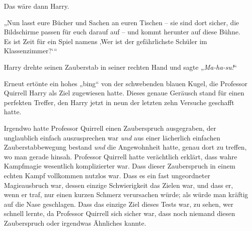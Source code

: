 Das wäre dann Harry.

„Nun lasst eure Bücher und Sachen an euren Tischen – sie sind dort sicher, die Bildschirme passen für euch darauf auf – und kommt herunter auf diese Bühne. Es ist Zeit für ein Spiel namens ‚Wer ist der gefährlichste Schüler im Klassenzimmer?‘“

\later

Harry drehte seinen Zauberstab in seiner rechten Hand und sagte „\emph{Ma-ha-su!}“

Erneut ertönte ein hohes „bing“ von der schwebenden blauen Kugel, die Professor Quirrell Harry als Ziel zugewiesen hatte. Dieses genaue Geräusch stand für einen perfekten Treffer, den Harry jetzt in neun der letzten zehn Versuche geschafft hatte.

Irgendwo hatte Professor Quirrell einen Zauberspruch ausgegraben, der unglaublich einfach auszusprechen war \emph{und} aus einer lächerlich einfachen Zauberstabbewegung bestand \emph{und} die Angewohnheit hatte, genau dort zu treffen, wo man gerade hinsah. Professor Quirrell hatte verächtlich erklärt, dass wahre Kampfmagie wesentlich komplizierter war. Dass dieser Zauberspruch in einem echten Kampf vollkommen nutzlos war. Dass es ein fast ungeordneter Magieausbruch war, dessen einzige Schwierigkeit das Zielen war, und dass er, wenn er traf, nur einen kurzen Schmerz verursachen würde; als würde man kräftig auf die Nase geschlagen. Dass das einzige Ziel dieses Tests war, zu sehen, wer schnell lernte, da Professor Quirrell sich sicher war, dass noch niemand diesen Zauberspruch oder irgendwas Ähnliches kannte.

